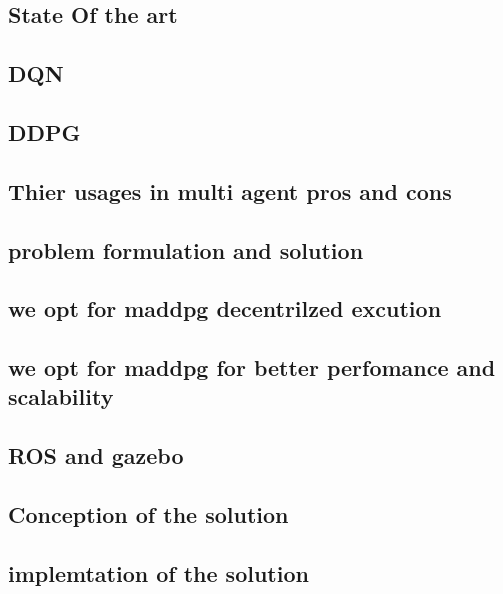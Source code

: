 \documentclass[12pt]{article}
\begin{document}
\subsection{State Of the art}
\subsection{DQN}
\subsection{DDPG}
\subsection{Thier usages in multi agent pros and cons}
\subsection{problem formulation and solution}
\subsection{we opt for maddpg decentrilzed excution }
\subsection{we opt for maddpg for better perfomance and scalability }


\subsection{ROS and gazebo}


\subsection{Conception of the solution}


\subsection{implemtation of the solution}











 


\newpage


\end{document}
